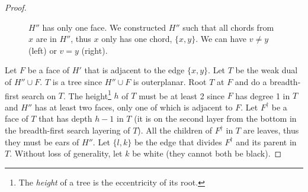 \documentclass{patmorin}
\begin{document}
\begin{proof}
\begin{figure}[!ht]
  \hspace{50px}
  \caption{$H''$ has only one face. We constructed $H''$ such that all chords from $x$ are in $H''$, thus $x$ only has one chord, $\{x,y\}$. We can have $v\not=y$ (left) or $v=y$ (right).}
  \label{fig:ifOneFaceHprimeprime}
  
\end{figure}
Let $F$ be a face of $H'$ that is adjacent to the edge $\{x,y\}$. Let $T$ be the weak dual of $H'' \cup F$. $T$ is a tree since $H'' \cup F$ is outerplanar. Root $T$ at $F$ and do a breadth-first search on $T$. The height\footnote{The \emph{height} of a tree is the eccentricity of its root.} $h$ of $T$ must be at least 2 since $F$ has degree 1 in $T$ and $H''$ has at least two faces, only one of which is adjacent to $F$. Let $F^{\dagger}$ be a face of $T$ that has depth $h-1$ in $T$ (it is on the second layer from the bottom in the breadth-first search layering of $T$). All the children of $F^{\dagger}$ in $T$ are leaves, thus they must be ears of $H''$. Let $\{l,k\}$ be the edge that divides $F^{\dagger}$ and its parent in $T$. Without loss of generality, let $k$ be white (they cannot both be black). %


\end{proof}
\end{document}
